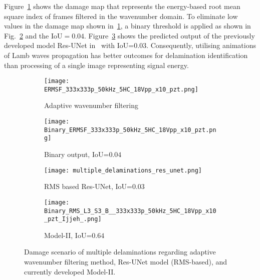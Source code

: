 \begin{sloppypar}
	Figure~\ref{fig:ERMSF} shows the damage map that represents the energy-based root mean square index of frames filtered in the wavenumber domain.
	To eliminate low values in the damage map shown in~\ref{fig:ERMSF}, a binary threshold is applied as shown in Fig.~\ref{fig:binary_ERMSF} and the IoU\(=0.04\).
	Figure~\ref{fig:Res_UNet} shows the predicted output of the previously developed model Res-UNet in~\cite{Ijjeh2022} with IoU=$0.03$.
	Consequently, utilising animations of Lamb waves propagation has better outcomes for delamination identification than processing of a single image representing signal energy.
	
	\begin{figure} [!ht]
		\begin{subfigure}[b]{.48\textwidth}
			\centering
			\texttt{[image: ERMSF\_333x333p\_50kHz\_5HC\_18Vpp\_x10\_pzt.png]}
			\caption{Adaptive wavenumber filtering}
			\label{fig:ERMSF}
		\end{subfigure}
		\hfill
		\begin{subfigure}[b]{.48\textwidth}
			\centering
			\texttt{[image: Binary\_ERMSF\_333x333p\_50kHz\_5HC\_18Vpp\_x10\_pzt.png]}
			\caption{Binary output, IoU=$0.04$} 
			\label{fig:binary_ERMSF}
		\end{subfigure}
		\hfill
		\begin{subfigure}[b]{.48\textwidth}
			\centering
			\texttt{[image: multiple\_delaminations\_res\_unet.png]}
			\caption{RMS based Res-UNet, IoU=$0.03$} 
			\label{fig:Res_UNet}
		\end{subfigure}
		\hfill
		\begin{subfigure}[b]{.48\textwidth}
			\centering
			\texttt{[image: Binary\_RMS\_L3\_S3\_B\_\_333x333p\_50kHz\_5HC\_18Vpp\_x10\_pzt\_Ijjeh\_.png]}
			\caption{Model-II, IoU=\(0.64\)} 
			\label{fig:RMS_threshold_L3_S4_B_ijjeh_compare}
		\end{subfigure}
		\caption{Damage scenario of multiple delaminations regarding adaptive wavenumber filtering method, Res-UNet model (RMS-based), and currently developed Model-II.}
		\label{fig:comparison_all_models}
	\end{figure} 
\end{sloppypar}
